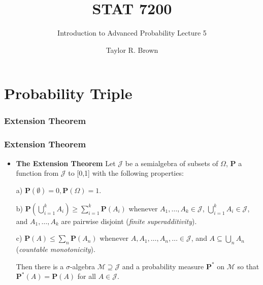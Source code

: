 \documentclass[handout]{beamer}
\title{STAT 7200}
\subtitle{Introduction to Advanced Probability \newline Lecture 5}
\author{Taylor R. Brown}
\institute{}
\date{}
\newcommand{\BP}{\mathbf{P}}
\begin{document}
\frame{\titlepage}

\section[Outline]{}


\section{Probability Triple}

\subsubsection{Extension Theorem}
\frame
{
  \frametitle{Extension Theorem}

   \begin{itemize}

             \item<1-> [] \begin{Theorem} \textbf{The Extension Theorem}  Let $\mathcal{J}$ be a semialgebra of subsets of $\Omega$,  $\mathbf{P}$ a function from $\mathcal{J}$  to [0,1] with the following properties:
             \newline
             
             a) $\mathbf{P} (\emptyset)=0, \mathbf{P}(\Omega)=1$.
                 \newline
         
             b) $\BP(\bigcup_{i=1}^k A_i)\geq \sum_{i=1}^k \BP(A_i)$ whenever $A_1,\ldots,A_k \in\mathcal{J}$, $\bigcup_{i=1}^k A_i  \in\mathcal{J}$, and $A_1,\ldots,A_k$ are pairwise disjoint (\textit{finite superadditivity}).
                   \newline
       
             c) $\BP(A)\leq \sum_{n} \BP(A_n)$ whenever $A,A_1,\ldots,A_n,\ldots \in\mathcal{J}$, and $A\subseteq \bigcup_{n} A_n$ (\textit{countable monotonicity}).               
             \newline
             
             Then there is a $\sigma$-algebra $\mathcal{M} \supseteq \mathcal{J}$ and a probability measure $\BP^*$ on $\mathcal{M}$ so that $\BP^*(A)=\BP(A)$ for all $A\in \mathcal{J}$.
             \end{Theorem}    
       
                
                 \end{itemize}
}
\end{document}
